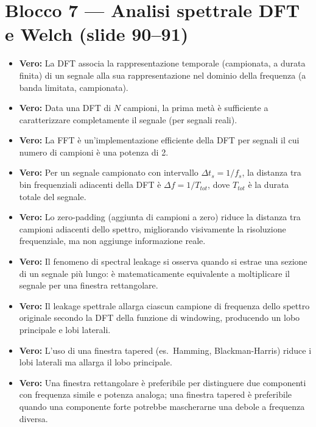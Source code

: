 \section{Blocco 7 — Analisi spettrale DFT e Welch (slide 90--91)}

\begin{itemize}
    \item \textbf{Vero:} La DFT associa la rappresentazione temporale (campionata, a durata finita) di un segnale alla sua rappresentazione nel dominio della frequenza (a banda limitata, campionata).
    
    \item \textbf{Vero:} Data una DFT di $N$ campioni, la prima metà è sufficiente a caratterizzare completamente il segnale (per segnali reali).
    
    \item \textbf{Vero:} La FFT è un'implementazione efficiente della DFT per segnali il cui numero di campioni è una potenza di 2.
    
    \item \textbf{Vero:} Per un segnale campionato con intervallo $\Delta t_s = 1/f_s$, la distanza tra bin frequenziali adiacenti della DFT è $\Delta f = 1/T_{tot}$, dove $T_{tot}$ è la durata totale del segnale.
    
    \item \textbf{Vero:} Lo zero-padding (aggiunta di campioni a zero) riduce la distanza tra campioni adiacenti dello spettro, migliorando visivamente la risoluzione frequenziale, ma non aggiunge informazione reale.
    
    \item \textbf{Vero:} Il fenomeno di spectral leakage si osserva quando si estrae una sezione di un segnale più lungo: è matematicamente equivalente a moltiplicare il segnale per una finestra rettangolare.
    
    \item \textbf{Vero:} Il leakage spettrale allarga ciascun campione di frequenza dello spettro originale secondo la DFT della funzione di windowing, producendo un lobo principale e lobi laterali.
    
    \item \textbf{Vero:} L'uso di una finestra tapered (es.\ Hamming, Blackman-Harris) riduce i lobi laterali ma allarga il lobo principale.
    
    \item \textbf{Vero:} Una finestra rettangolare è preferibile per distinguere due componenti con frequenza simile e potenza analoga; una finestra tapered è preferibile quando una componente forte potrebbe mascherarne una debole a frequenza diversa.
    

\end{itemize}
